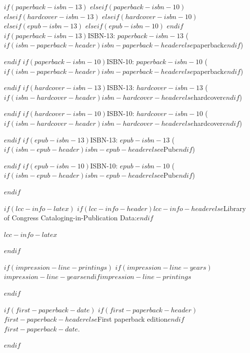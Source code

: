 \begin{singlespacing}
$if(paperback-isbn-13)$\vspace{0.4cm}
$elseif(paperback-isbn-10)$\vspace{0.4cm}
$elseif(hardcover-isbn-13)$\vspace{0.4cm}
$elseif(hardcover-isbn-10)$\vspace{0.4cm}
$elseif(epub-isbn-13)$\vspace{0.4cm}
$elseif(epub-isbn-10)$\vspace{0.4cm}
$endif$
  $if(paperback-isbn-13)$\noindent ISBN-13: {$paperback-isbn-13$} ($if(isbn-paperback-header)$$isbn-paperback-header$$else$paperback$endif$) \par $endif$
  $if(paperback-isbn-10)$\noindent ISBN-10: {$paperback-isbn-10$} ($if(isbn-paperback-header)$$isbn-paperback-header$$else$paperback$endif$) \par $endif$
  $if(hardcover-isbn-13)$\noindent ISBN-13: {$hardcover-isbn-13$} ($if(isbn-hardcover-header)$$isbn-hardcover-header$$else$hardcover$endif$) \par $endif$
  $if(hardcover-isbn-10)$\noindent ISBN-10: {$hardcover-isbn-10$} ($if(isbn-hardcover-header)$$isbn-hardcover-header$$else$hardcover$endif$) \par $endif$
  $if(epub-isbn-13)$\noindent ISBN-13: {$epub-isbn-13$} ($if(isbn-epub-header)$$isbn-epub-header$$else$ePub$endif$) \par $endif$
  $if(epub-isbn-10)$\noindent ISBN-10: {$epub-isbn-10$} ($if(isbn-epub-header)$$isbn-epub-header$$else$ePub$endif$) \par $endif$

$if(lcc-info-latex)$
\vspace{0.4cm}
\noindent $if(lcc-info-header)$$lcc-info-header$$else$Library of Congress Cataloging-in-Publication Data:$endif$ \par
$lcc-info-latex$ \par
$endif$

$if(impression-line-printings)$
\vspace{0.4cm}
\noindent $if(impression-line-years)$$impression-line-years$\hspace{.5cm}$endif$$impression-line-printings$ \par
$endif$

$if(first-paperback-date)$
\vspace{0.4cm}
\noindent $if(first-paperback-header)$$first-paperback-header$$else$First paperback edition$endif$ $first-paperback-date$. \par
$endif$


\end{singlespacing}
